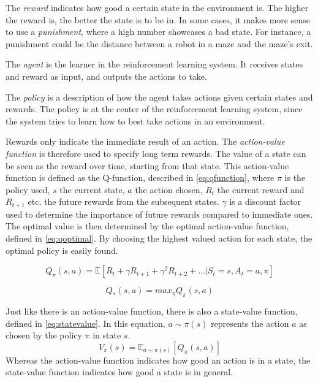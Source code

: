 \documentclass{kththesis}
\begin{document}
The \textit{reward} indicates how good a certain state in the environment is. The higher the reward is, the better the state is to be in. In some cases, it makes more sense to use a \textit{punishment}, where a high number showcases a bad state. For instance, a punishment could be the distance between a robot in a maze and the maze's exit. 

The \textit{agent} is the learner in the reinforcement learning system. It receives states and reward as input, and outputs the actions to take.

The \textit{policy} is a description of how the agent takes actions given certain states and rewards. The policy is at the center of the reinforcement learning system, since the system tries to learn how to best take actions in an environment. \parencite{sutton1998introduction}

Rewards only indicate the immediate result of an action. The \textit{action-value function} is therefore used to specify long term rewards. The value of a state can be seen as the reward over time, starting from that state. This action-value function is defined as the Q-function, described in \autoref{eq:qfunction}, where $\pi$ is the policy used, $s$ the current state, $a$ the action chosen, $R_t$ the current reward and $R_{t+1}$ etc. the future rewards from the subsequent states. $\gamma$ is a discount factor used to determine the importance of future rewards compared to immediate ones. The optimal value is then determined by the optimal action-value function, defined in \autoref{eq:qoptimal}. By choosing the highest valued action for each state, the optimal policy is easily found. \parencite{van2016deep}

\begin{equation}
\label{eq:qfunction}
Q_\pi(s, a) = \mathbb{E}[R_t + \gamma R_{t+1} + \gamma^2R_{t+2} + ... | S_t = s, A_t = a, \pi]
\end{equation}

\begin{equation}
\label{eq:qoptimal}
Q_*(s, a) = max_\pi Q_\pi(s, a)
\end{equation}

Just like there is an action-value function, there is also a state-value function, defined in \autoref{eq:statevalue}. In this equation, $a\sim\pi(s)$ represents the action $a$ as chosen by the policy $\pi$ in state $s$.
\begin{equation}
\label{eq:statevalue}
V_\pi(s) = \mathbb{E}_{a\sim\pi(s)}[Q_\pi(s,a)]
\end{equation}
Whereas the action-value function indicates how good an action is in a state, the state-value function indicates how good a state is in general. \parencite{wang2015dueling}
\end{document}

